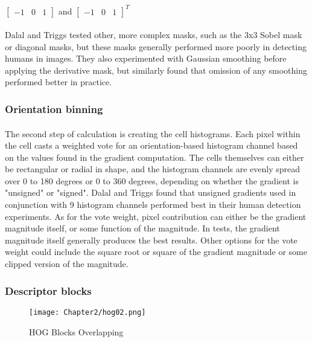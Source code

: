 		$\begin{bmatrix} -1 & 0 & 1 \end{bmatrix}$ and $\begin{bmatrix} -1 & 0 & 1 \end{bmatrix}^{T}$
		
		\paragraph{}Dalal and Triggs tested other, more complex masks, such as the 3x3 Sobel mask or diagonal masks, but these masks generally performed more poorly in detecting humans in images. They also experimented with Gaussian smoothing before applying the derivative mask, but similarly found that omission of any smoothing performed better in practice.
		
		\subsubsection{Orientation binning}
		\paragraph{}The second step of calculation is creating the cell histograms. Each pixel within the cell casts a weighted vote for an orientation-based histogram channel based on the values found in the gradient computation. The cells themselves can either be rectangular or radial in shape, and the histogram channels are evenly spread over 0 to 180 degrees or 0 to 360 degrees, depending on whether the gradient is "unsigned" or "signed". Dalal and Triggs found that unsigned gradients used in conjunction with 9 histogram channels performed best in their human detection experiments. As for the vote weight, pixel contribution can either be the gradient magnitude itself, or some function of the magnitude. In tests, the gradient magnitude itself generally produces the best results. Other options for the vote weight could include the square root or square of the gradient magnitude or some clipped version of the magnitude.
		
		\subsubsection{Descriptor blocks}
		
		\begin{figure}[h]
			\begin{center}
				\texttt{[image: Chapter2/hog02.png]}
				\caption{HOG Blocks Overlapping}
				\label{fig:hogblocks}
			\end{center}
		\end{figure}
		
